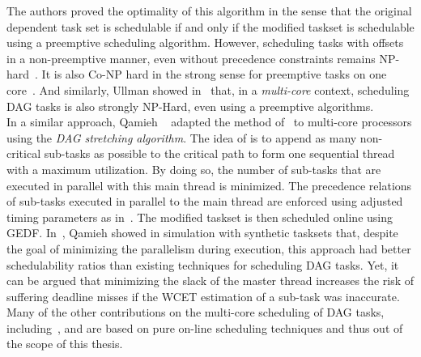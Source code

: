 \documentclass[main.tex]{subfiles}
\begin{document}
The authors proved the optimality of this algorithm in the sense that the original dependent task set is schedulable if and only if the modified taskset is schedulable using a preemptive scheduling algorithm. However, scheduling tasks with offsets in a non-preemptive manner, even without precedence constraints remains NP-hard~\cite{Lenstra1977}. It is also Co-NP hard in the strong sense for preemptive tasks on one core~\cite{Leung1982}. And similarly, Ullman showed in~\cite{Ullman1975} that, in a \emph{multi-core} context, scheduling DAG tasks is also strongly NP-Hard, even using a preemptive algorithms. \\ 

In a similar approach, Qamieh \etal~\cite{Qamhieh2013, Qamhieh2014} adapted the method of~\cite{Chetto1990} to multi-core processors using the \emph{DAG stretching algorithm}. The idea of is to append as many non-critical sub-tasks as possible to the critical path to form one sequential thread with a maximum utilization. By doing so, the number of sub-tasks that are executed in parallel with this main thread is minimized. The precedence relations of sub-tasks executed in parallel to the main thread are enforced using adjusted timing parameters as in~\cite{Chetto1990}. The modified taskset is then scheduled online using GEDF. In~\cite{Qamhieh2014}, Qamieh \etal showed in simulation with synthetic tasksets that, despite the goal of minimizing the parallelism during execution, this approach had better schedulability ratios than existing techniques for scheduling DAG tasks. Yet, it can be argued that minimizing the slack of the master thread increases the risk of suffering deadline misses if the WCET estimation of a sub-task was inaccurate. \\

Many of the other contributions on the multi-core scheduling of DAG tasks, including~\cite{Baruah2012_RTSS}, \cite{Li13} and \cite{Bonifaci2013} are based on pure on-line scheduling techniques and thus out of the scope of this thesis.
\end{document}
